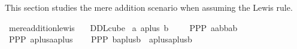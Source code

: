 %
\begin{isabellebody}%
%
%
\isadelimdocument
%
\endisadelimdocument
%
\isatagdocument
%
\isamarkuptrue%
%
\endisatagdocument
{\isafolddocument}%
%
\isadelimdocument
%
\endisadelimdocument
%
\begin{isamarkuptext}%
This section studies the mere addition scenario \cite{Parfit1984-PARRAP,ddl:T87} when assuming the Lewis rule.%
\end{isamarkuptext}\isamarkuptrue%
%
\isadelimtheory
%
\endisadelimtheory
%
\isatagtheory
{}\isamarkupfalse%
\ mere{\isacharunderscore}{\kern0pt}addition{\isacharunderscore}{\kern0pt}lewis\ \ \isanewline
{}\ DDLcube\isanewline
\isanewline
{}%
\endisatagtheory
{\isafoldtheory}%
%
\isadelimtheory
%
\endisadelimtheory
\isanewline
\isanewline
{}\isamarkupfalse%
\ a{\isacharcolon}{\kern0pt}{\isacharcolon}{\kern0pt}{\isasymsigma}\ aplus{\isacharcolon}{\kern0pt}{\isacharcolon}{\kern0pt}{\isasymsigma}\ b{\isacharcolon}{\kern0pt}{\isacharcolon}{\kern0pt}{\isasymsigma}\isanewline
\isanewline
{}\isamarkupfalse%
\ \isanewline
\ %
\isanewline
\ PPP{}{\isacharcolon}{\kern0pt}\ {\isachardoublequoteopen}{\isasymlfloor}{\isacharparenleft}{\kern0pt}\isactrlbold {\isasymnot}{\isasymcirc}{\isacharless}{\kern0pt}\isactrlbold {\isasymnot}a{\isacharbar}{\kern0pt}a\isactrlbold {\isasymor}b{\isachargreater}{\kern0pt}\isactrlbold {\isasymand}{\isasymcirc}{\isacharless}{\kern0pt}\isactrlbold {\isasymnot}b{\isacharbar}{\kern0pt}a\isactrlbold {\isasymor}b{\isachargreater}{\kern0pt}{\isacharparenright}{\kern0pt}{\isasymrfloor}{\isachardoublequoteclose}\ \isanewline
\ %
\isanewline
\ PPP{}{\isacharcolon}{\kern0pt}\ {\isachardoublequoteopen}{\isasymlfloor}\isactrlbold {\isasymnot}{\isasymcirc}{\isacharless}{\kern0pt}\isactrlbold {\isasymnot}aplus{\isacharbar}{\kern0pt}a\isactrlbold {\isasymor}aplus{\isachargreater}{\kern0pt}{\isasymrfloor}{\isachardoublequoteclose}\ \isanewline
\ %
\isanewline
\ PPP{}{\isacharcolon}{\kern0pt}\ {\isachardoublequoteopen}{\isasymlfloor}{\isacharparenleft}{\kern0pt}\isactrlbold {\isasymnot}{\isasymcirc}{\isacharless}{\kern0pt}\isactrlbold {\isasymnot}b{\isacharbar}{\kern0pt}aplus\isactrlbold {\isasymor}b{\isachargreater}{\kern0pt}\ \isactrlbold {\isasymand}\ {\isasymcirc}{\isacharless}{\kern0pt}\isactrlbold {\isasymnot}aplus{\isacharbar}{\kern0pt}aplus\isactrlbold {\isasymor}b{\isachargreater}{\kern0pt}{\isacharparenright}{\kern0pt}{\isasymrfloor}{\isachardoublequoteclose}%

\end{isabellebody}
